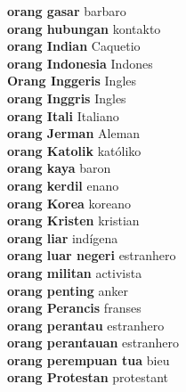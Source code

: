 \textbf{ orang gasar  } barbaro \\
\textbf{ orang hubungan  } kontakto \\
\textbf{ orang Indian  } Caquetio \\
\textbf{ orang Indonesia  } Indones \\
\textbf{ Orang Inggeris  } Ingles \\
\textbf{ orang Inggris  } Ingles \\
\textbf{ orang Itali  } Italiano \\
\textbf{ orang Jerman  } Aleman \\
\textbf{ orang Katolik  } katóliko \\
\textbf{ orang kaya  } baron \\
\textbf{ orang kerdil  } enano \\
\textbf{ orang Korea  } koreano \\
\textbf{ orang Kristen  } kristian \\
\textbf{ orang liar  } indígena \\
\textbf{ orang luar negeri  } estranhero \\
\textbf{ orang militan  } activista \\
\textbf{ orang penting  } anker \\
\textbf{ orang Perancis  } franses \\
\textbf{ orang perantau  } estranhero \\
\textbf{ orang perantauan  } estranhero \\
\textbf{ orang perempuan tua  } bieu \\
\textbf{ orang Protestan  } protestant \\
